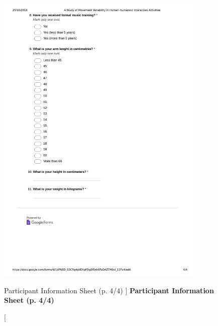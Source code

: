 \begin{figure}
 \centering
   \includegraphics[width=0.9\textwidth]{epi4}
   \caption
	[Participant Information Sheet (p. 4/4) ]{
	{\bf Participant Information Sheet (p. 4/4)}
}
   \label{fig:epi4}
\end{figure}







